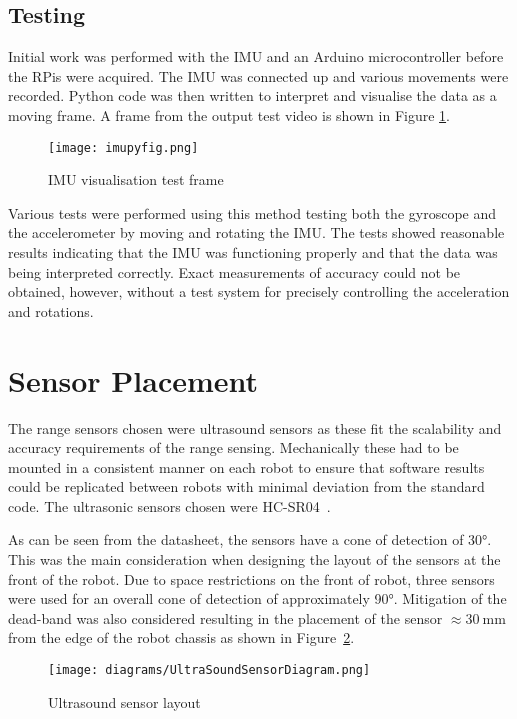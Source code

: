 \subsection{Testing}\label{elec/imu/test}
Initial work was performed with the IMU and an Arduino microcontroller
before the RPis were acquired. The IMU was connected up and various
movements were recorded. Python code was then written to interpret and
visualise the data as a moving frame. A frame from the output test video is shown in Figure \ref{fig:imu_py_test}.

\begin{figure}[!ht]
	\centering
	\texttt{[image: imupyfig.png]}
	\caption{IMU visualisation test frame}\label{fig:imu_py_test}

\end{figure}

Various tests were performed using this method testing both the gyroscope and the
accelerometer by moving and rotating the IMU. The tests showed reasonable results
indicating that the IMU was functioning properly and that the data was being interpreted
correctly. Exact measurements of accuracy could not be obtained, however, without a test
system for precisely controlling the acceleration and rotations.

\section{Sensor Placement}\label{mech/sensors}
The range sensors chosen were ultrasound sensors as these fit the
scalability and accuracy requirements of the range sensing.
Mechanically these had to be mounted in a consistent manner on each
robot to ensure that software results could be replicated between
robots with minimal deviation from the standard code. The ultrasonic
sensors chosen were HC-SR04~\cite{HCSR04datasheet}.

As can be seen from the datasheet, the sensors have a cone of
detection of \ang{30}. This was the main consideration when designing
the layout of the sensors at the front of the robot. Due to space
restrictions on the front of robot, three sensors were used for an
overall cone of detection of approximately \ang{90}. Mitigation of the dead-band was also considered resulting in the placement of
the sensor $\approx{\SI{30}{\mm}}$ from the edge of the robot chassis as shown in Figure~\ref{UltraSoundSensorDiagram}.

\begin{figure}[!ht]
	\centering
	\texttt{[image: diagrams/UltraSoundSensorDiagram.png]}
	\caption{Ultrasound sensor layout}\label{UltraSoundSensorDiagram}

\end{figure}

